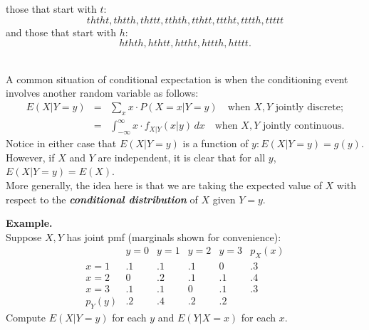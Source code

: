 \documentclass[12pt]{article}
\begin{document}
those that start with $t$:
$$ththt, thtth, thttt, tthth, tthtt, tttht, tttth, ttttt$$
and those that start with $h$:
$$hthth, hthtt, httht, httth, htttt.$$

\newpage

\\
A common situation of conditional expectation is when the conditioning event involves another random variable as follows:
\begin{eqnarray*}
    E(X | Y = y) &=& \sum_x x \cdot P(X = x | Y = y) \quad \text{when }X, Y\text{ jointly discrete;} \\
    &=& \int_{-\infty}^{\infty} x \cdot f_{X | Y} (x | y) \,dx  \quad \text{when }X, Y\text{ jointly continuous.}
\end{eqnarray*}
Notice in either case that $E(X | Y = y)$ is a function of $y: E(X | Y = y) = g(y)$.\\
However, if $X$ and $Y$ are independent, it is clear that for all $y$, $E(X | Y = y) = E(X)$. \vspace{0.25cm}\\
More generally, the idea here is that we are taking the expected value of $X$ with respect to the \textbf{\emph{conditional distribution}} of $X$ given $Y = y$.

\vspace{0.5cm}

\noindent \textbf{Example.} \\
Suppose $X, Y$ has joint pmf (marginals shown for convenience):
$$\begin{array}{c||c|c|c|c||c} & y=0 & y=1 & y=2 & y=3 & p_X(x)\\ \hline\hline
x=1 & .1 & .1 & .1 & 0 & .3\\ \hline
x=2 & 0 & .2 & .1 & .1 & .4\\ \hline
x=3 & .1 & .1 & 0 & .1 & .3\\ \hline\hline
p_Y(y) & .2 & .4 & .2 & .2 &   \end{array}$$
Compute $E(X|Y=y)$ for each $y$ and $E(Y|X=x)$ for each $x$.\\
\end{document}
